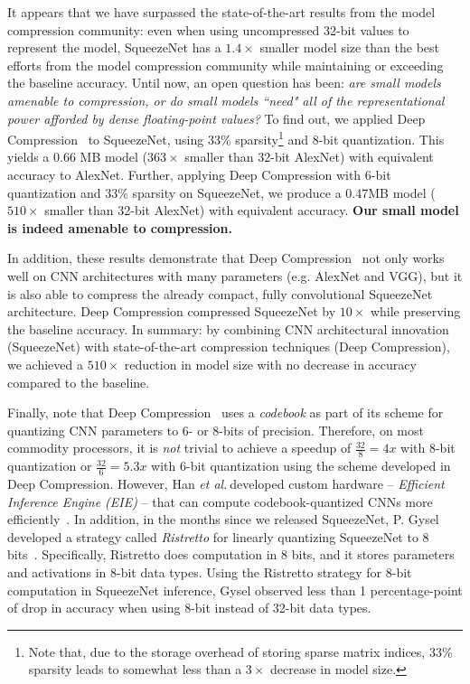 \documentclass{article} %
\newcommand{\etal}{\textit{et al}.$~$}
\renewcommand{\cite}{\citep}
\begin{document}
It appears that we have surpassed the state-of-the-art results from the model compression community:
even when using uncompressed 32-bit values to represent the model, SqueezeNet has a $1.4\times$ smaller model size than the best efforts from the model compression community while maintaining or exceeding the baseline accuracy.
Until now, an open question has been: {\em are small models amenable to compression, or do small models ``need" all of the representational power afforded by dense floating-point values?}
To find out, we applied Deep Compression~\cite{dally2015-2} to SqueezeNet, using 33\% sparsity\footnote{Note that, due to the storage overhead of storing sparse matrix indices, 33\% sparsity leads to somewhat less than a $3\times$ decrease in model size.} and 8-bit quantization.
This yields a 0.66 MB model ($363\times$ smaller than 32-bit AlexNet) with equivalent accuracy to AlexNet.
Further, applying Deep Compression with 6-bit quantization and 33\% sparsity on SqueezeNet, we produce a 0.47MB model ($510\times$ smaller than 32-bit AlexNet) with equivalent accuracy.
{\bf Our small model is indeed amenable to compression.}

In addition, these results demonstrate that Deep Compression~\cite{dally2015-2} not only works well on CNN architectures with many parameters (e.g. AlexNet and VGG), but it is also able to compress the already compact, fully convolutional SqueezeNet architecture. 
Deep Compression compressed SqueezeNet by $10\times$ while preserving the baseline accuracy.
In summary: by combining CNN architectural innovation (SqueezeNet) with state-of-the-art compression techniques (Deep Compression), we achieved a $510\times$ reduction in model size with no decrease in accuracy compared to the baseline.

Finally, note that Deep Compression~\cite{dally2015-1} uses a {\em codebook} as part of its scheme for quantizing CNN parameters to 6- or 8-bits of precision.
Therefore, on most commodity processors, it is {\em not} trivial to achieve a speedup of $\frac{32}{8}=4x$ with 8-bit quantization or $\frac{32}{6}=5.3x$ with 6-bit quantization using the scheme developed in Deep Compression.
However, Han \etal developed custom hardware -- {\em Efficient Inference Engine (EIE)} -- that can compute codebook-quantized CNNs more efficiently~\cite{EIE}.
In addition, in the months since we released SqueezeNet, P. Gysel developed a strategy called {\em Ristretto} for linearly quantizing SqueezeNet to 8 bits~\cite{Ristretto}.
Specifically, Ristretto does computation in 8 bits, and it stores parameters and activations in 8-bit data types.
Using the Ristretto strategy for 8-bit computation in SqueezeNet inference, Gysel observed less than 1 percentage-point of drop in accuracy when using 8-bit instead of 32-bit data types.
\end{document}

